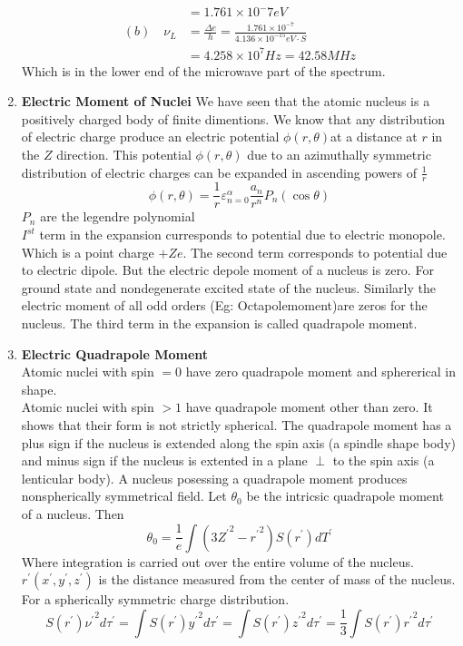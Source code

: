 \begin{enumerate}
\begin{answer}
\begin{align*}
	&=1.761\times10^-7 eV\\
	(b)\quad \nu_{L}&=\frac{\Delta e}{h}=\frac{1.761\times10^{-7}}{4.136\times10^{-15}eV\cdot S}\\
	&=4.258\times10^7Hz=42.58MHz
	\end{align*}
	Which is in the lower end of the microwave part of the spectrum.
\end{answer}
\item \textbf{Electric Moment of Nuclei}
We have seen that the atomic nucleus is a positively charged body of finite dimentions. We know that any distribution of electric charge produce an electric potential $\phi(r,\theta)$at a distance at $r$ in the $Z$ direction. This potential $\phi(r,\theta)$ due to an azimuthally symmetric distribution of electric charges can be expanded in ascending powers of $\frac{1}{r}$
$$\phi(r,\theta)=\frac{1}{r}\varepsilon^\alpha_{n=0}\frac{a_n}{r^n}P_n(\cos\theta)$$
$P_n$ are the legendre polynomial\\
$I^{st}$ term in the expansion curresponds to potential due to electric monopole. Which is a point charge $+Ze$. The second term corresponds to potential due to electric dipole. But the electric depole moment of a nucleus is zero. For ground state and nondegenerate excited state of the nucleus. Similarly the electric moment of all odd orders (Eg: Octapolemoment)are zeros for the nucleus. The third term in the expansion is called quadrapole moment.
\item \textbf{Electric Quadrapole Moment}\\
Atomic nuclei with spin $=0$ have zero quadrapole moment and sphererical in shape. \\
Atomic nuclei with spin $>1$ have quadrapole moment other than zero. It shows that their form is not strictly spherical. The quadrapole moment has a plus sign if the nucleus is  extended along  the spin axis (a spindle shape body) and minus sign if the nucleus is extented in a plane $\perp$ to the spin axis (a lenticular body). A nucleus posessing a quadrapole moment produces nonspherically symmetrical field. Let $\theta_0$ be the intricsic quadrapole moment of a nucleus. Then 
$$\theta_0=\frac{1}{e}\int(3{Z^\prime}^2-{r^\prime}^2)S(r^\prime)dT^\prime$$
Where integration is carried out over the entire volume of the nucleus. $r^\prime(x^\prime,y^\prime,z^\prime
)$ is the distance measured from the center of mass of the nucleus.\\
For a spherically symmetric charge distribution.
$$S(r^\prime){\nu^\prime}^2d\tau^\prime=\int S(r^\prime){y^\prime}^2d\tau^\prime=\int S(r^\prime){z^\prime}^2d\tau^\prime=\frac{1}{3}\int S(r^\prime){r^\prime}^2d\tau^\prime$$

\end{enumerate}
